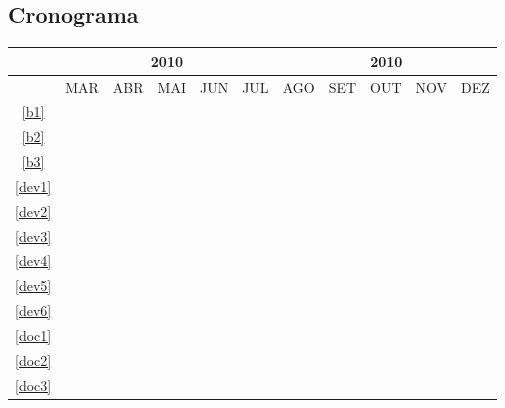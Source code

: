 \subsection{Cronograma}

\begin{table}[!htbp]
	\centering
		\begin{tabular}{|c|c|c|c|c|c|c|c|c|c|c|}
		\hline
		&\multicolumn{5}{c|}{2010}&\multicolumn{5}{c|}{2010}\\
		\hline
		&MAR&ABR&MAI&JUN&JUL&AGO&SET&OUT&NOV&DEZ\\
		\hline
		\ref{b1}&\cellcolor{midgray}&&&&&&&&&\\
		\hline
		\ref{b2}&&\cellcolor{midgray}&&&&&&&&\\
		\hline	
		\ref{b3}&&\cellcolor{midgray}&&&&&&&&\\
		\hline			
		\ref{dev1}&&\cellcolor{midgray}&\cellcolor{midgray}&&&&&&&\\
		\hline	
		\ref{dev2}&&&\cellcolor{midgray}&&&&&&&\\
		\hline
		\ref{dev3}&&&\cellcolor{midgray}&\cellcolor{midgray}&&&&&&\\
		\hline	
		\ref{dev4}&&&&\cellcolor{midgray}&\cellcolor{midgray}&&&&&\\
		\hline	
		\ref{dev5}&&&\cellcolor{midgray}&\cellcolor{midgray}&\cellcolor{midgray}&&&&&\\
		\hline	
		\ref{dev6}&&&&&\cellcolor{midgray}&&&&&\\
		\hline	
		\ref{doc1}&&&&&&\cellcolor{midgray}&&&&\\
		\hline	
		\ref{doc2}&&&&&&&\cellcolor{midgray}&\cellcolor{midgray}&\cellcolor{midgray}&\\
		\hline	
		\ref{doc3}&&&&&&&&&&\cellcolor{midgray}\cellcolor{midgray}\\
		\hline	
		\end{tabular}
\end{table}